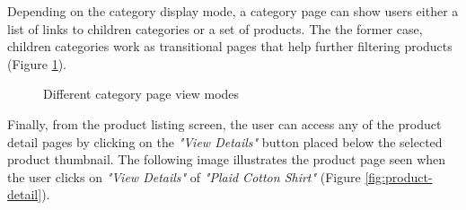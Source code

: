 Depending on the category display mode, a category page can show users either a list of links to children categories or a set of products. The the former case, children categories work as transitional pages that help further filtering products (Figure \ref{fig:category-display-modes}).


\vspace{0.5cm}
\begin{figure}[H]
  \centering
  \qquad
  \caption{Different category page view modes}%
  \label{fig:category-display-modes}%
\end{figure}
\vspace{0.5cm}

Finally, from the product listing screen, the user can access any of the product detail pages by clicking on the \textit{"View Details"} button placed below the selected product thumbnail. The following image illustrates the product page seen when the user clicks on \textit{"View Details"} of \textit{"Plaid Cotton Shirt"} (Figure \ref{fig:product-detail}).



